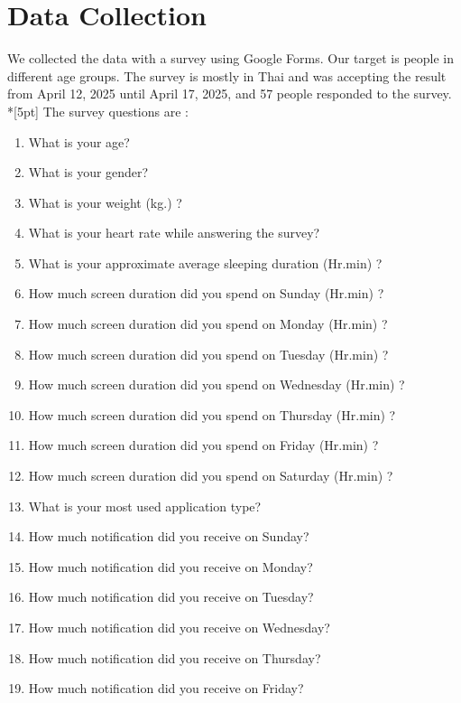 \chapter*{Data Collection}
We collected the data with a survey using Google Forms. Our target is people in different age groups. The survey is mostly in Thai and was accepting the result from April 12, 2025 until April 17, 2025, and 57 people responded to the survey.\\*[5pt]
The survey questions are : 
\begin{multicols}{2}
    \begin{enumerate}
        \item What is your age?
        \item What is your gender?
        \item What is your weight (kg.) ?
        \item What is your heart rate while answering the survey?
        \item What is your approximate average sleeping duration (Hr.min) ?
        \item How much screen duration did you spend on Sunday (Hr.min) ?
        \item How much screen duration did you spend on Monday (Hr.min) ?
        \item How much screen duration did you spend on Tuesday (Hr.min) ?
        \item How much screen duration did you spend on Wednesday (Hr.min) ?
        \item How much screen duration did you spend on Thursday (Hr.min) ?
        \item How much screen duration did you spend on Friday (Hr.min) ?
        \item How much screen duration did you spend on Saturday (Hr.min) ?
        \item What is your most used application type?
        \item How much notification did you receive on Sunday?
        \item How much notification did you receive on Monday?
        \item How much notification did you receive on Tuesday?
        \item How much notification did you receive on Wednesday?
        \item How much notification did you receive on Thursday?
        \item How much notification did you receive on Friday?

\end{enumerate}
\end{multicols}
